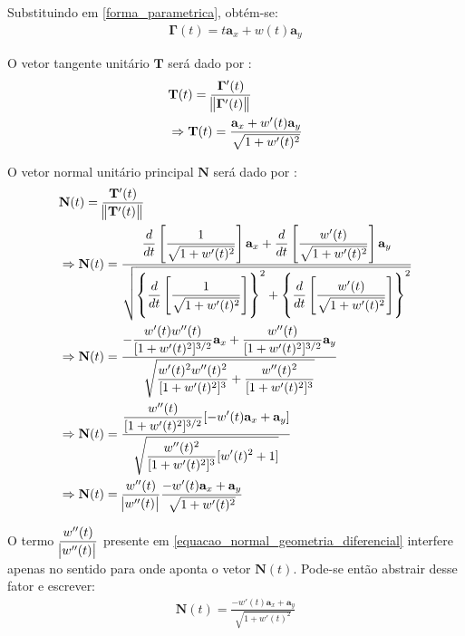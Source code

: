 Substituindo em \eqref{forma_parametrica}, obtém-se:
\begin{align}
\mathbf{\Gamma}(t) = t \mathbf{a}_x + w(t) \mathbf{a}_y \label{forma_parametrica_substituida}
\end{align}

O vetor tangente unitário $\mathbf{T}$ será dado por \citep{livro_stewart}:
\begin{align}
	& \mathbf{T}(t) = \frac{\mathbf{\Gamma}'(t)}{\norm{\mathbf{\Gamma}'(t)}} \nonumber \\
	& \Rightarrow \mathbf{T}(t) = \frac{\mathbf{a}_x + w'(t) \mathbf{a}_y}{\sqrt{1 + w'(t)^2}}
\end{align}

O vetor normal unitário principal $\mathbf{N}$ será dado por \citep{livro_stewart}:
\begin{align}
	& \mathbf{N}(t) = \frac{\mathbf{T}'(t)}{\norm{\mathbf{T}'(t)}} \nonumber \\
	& \Rightarrow \mathbf{N}(t) = \frac{ \displaystyle\frac{d}{dt}\left[\frac{1}{\sqrt{1 + w'(t)^2}}\right]\mathbf{a}_x
	+
	\displaystyle\frac{d}{dt}\left[\frac{w'(t)}{\sqrt{1 + w'(t)^2}}\right]\mathbf{a}_y }
	{\sqrt{ \left\lbrace \displaystyle\frac{d}{dt}\left[\frac{1}{\sqrt{1 + w'(t)^2}}\right] \right\rbrace ^2
	+
	 \left\lbrace \displaystyle\frac{d}{dt}\left[\frac{w'(t)}{\sqrt{1 + w'(t)^2}}\right] \right\rbrace ^2 }} \nonumber \\
	& \Rightarrow \mathbf{N}(t) = \frac{ -\displaystyle \frac{w'(t)w''(t)}{[1 + w'(t)^2]^{3/2}} \mathbf{a}_x
	+
	\displaystyle \frac{w''(t)}{[1 + w'(t)^2]^{3/2}} \mathbf{a}_y }
	{\sqrt{ \displaystyle \frac{w'(t)^2 w''(t)^2}{[1 + w'(t)^2]^3} 
	+
	\displaystyle \frac{w''(t)^2}{[1 + w'(t)^2]^{3}} }} \nonumber \\
	& \Rightarrow \mathbf{N}(t) = \frac{ \displaystyle\frac{w''(t)}{[1 + w'(t)^2]^{3/2}} [-w'(t)\mathbf{a}_x + \mathbf{a}_y] }
	{\sqrt{ \displaystyle \frac{w''(t)^2}{[1 + w'(t)^2]^3} [w'(t)^2	+ 1] }} \nonumber \\
	& \Rightarrow \mathbf{N}(t) = \frac{w''(t)}{\abs{w''(t)}} \frac{ -w'(t)\mathbf{a}_x + \mathbf{a}_y }
	{\sqrt{ 1 + w'(t)^2 }} \label{equacao_normal_geometria_diferencial}
\end{align}

O termo $\displaystyle\frac{w''(t)}{\abs{w''(t)}} $ presente em \eqref{equacao_normal_geometria_diferencial} interfere apenas no sentido para
onde aponta o vetor $\mathbf{N}(t)$. Pode-se então abstrair desse fator e escrever:
\begin{align}
	\mathbf{N}(t) = \frac{ -w'(t)\mathbf{a}_x + \mathbf{a}_y }{\sqrt{ 1 + w'(t)^2 }} \label{equacao_normal_geometria_diferencial_2}
\end{align}

